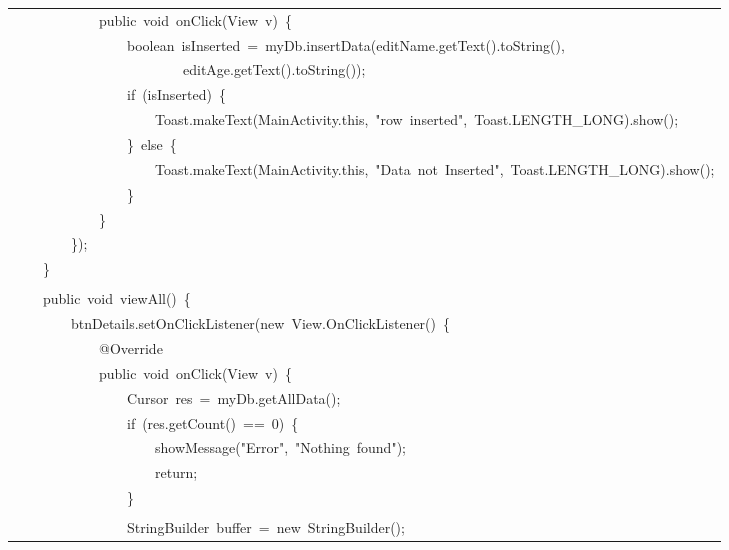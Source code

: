 \documentclass[a4paper,12pt]{article}
\begin{document}
\begin{longtable}{|p{}|}
{\ttfamily\small \ \ \ \ \ \ \ \ \ \ \ \ public\ void\ onClick(View\ v)\ \{} \\
{\ttfamily\small \ \ \ \ \ \ \ \ \ \ \ \ \ \ \ \ boolean\ isInserted\ =\ myDb.insertData(editName.getText().toString(),} \\
{\ttfamily\small \ \ \ \ \ \ \ \ \ \ \ \ \ \ \ \ \ \ \ \ \ \ \ \ editAge.getText().toString());} \\
{\ttfamily\small \ \ \ \ \ \ \ \ \ \ \ \ \ \ \ \ if\ (isInserted)\ \{} \\
{\ttfamily\small \ \ \ \ \ \ \ \ \ \ \ \ \ \ \ \ \ \ \ \ Toast.makeText(MainActivity.this,\ "row\ inserted",\ Toast.LENGTH\_LONG).show();} \\
{\ttfamily\small \ \ \ \ \ \ \ \ \ \ \ \ \ \ \ \ \}\ else\ \{} \\
{\ttfamily\small \ \ \ \ \ \ \ \ \ \ \ \ \ \ \ \ \ \ \ \ Toast.makeText(MainActivity.this,\ "Data\ not\ Inserted",\ Toast.LENGTH\_LONG).show();} \\
{\ttfamily\small \ \ \ \ \ \ \ \ \ \ \ \ \ \ \ \ \}} \\
{\ttfamily\small \ \ \ \ \ \ \ \ \ \ \ \ \}} \\
{\ttfamily\small \ \ \ \ \ \ \ \ \});} \\
{\ttfamily\small \ \ \ \ \}} \\
\strut \\
{\ttfamily\small \ \ \ \ public\ void\ viewAll()\ \{} \\
{\ttfamily\small \ \ \ \ \ \ \ \ btnDetails.setOnClickListener(new\ View.OnClickListener()\ \{} \\
{\ttfamily\small \ \ \ \ \ \ \ \ \ \ \ \ @Override} \\
{\ttfamily\small \ \ \ \ \ \ \ \ \ \ \ \ public\ void\ onClick(View\ v)\ \{} \\
{\ttfamily\small \ \ \ \ \ \ \ \ \ \ \ \ \ \ \ \ Cursor\ res\ =\ myDb.getAllData();} \\
{\ttfamily\small \ \ \ \ \ \ \ \ \ \ \ \ \ \ \ \ if\ (res.getCount()\ ==\ 0)\ \{} \\
{\ttfamily\small \ \ \ \ \ \ \ \ \ \ \ \ \ \ \ \ \ \ \ \ showMessage("Error",\ "Nothing\ found");} \\
{\ttfamily\small \ \ \ \ \ \ \ \ \ \ \ \ \ \ \ \ \ \ \ \ return;} \\
{\ttfamily\small \ \ \ \ \ \ \ \ \ \ \ \ \ \ \ \ \}} \\
\strut \\
{\ttfamily\small \ \ \ \ \ \ \ \ \ \ \ \ \ \ \ \ StringBuilder\ buffer\ =\ new\ StringBuilder();} \\

\end{longtable}
\end{document}
